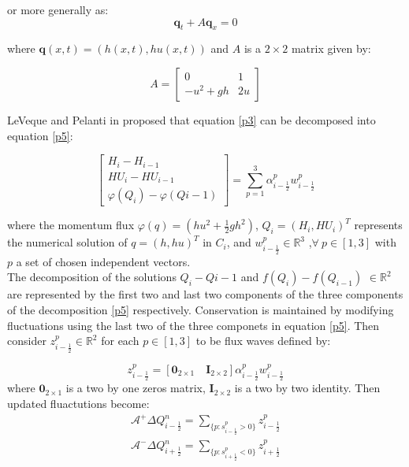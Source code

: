 \documentclass[12pt,a4paper]{article}
\begin{document}
	\noindent or more generally as:
	\begin{equation}
		\mathbf q_t + A \mathbf q_x = 0
	\end{equation}
	
	\noindent where $\mathbf q(x,t) = (h(x,t), hu(x,t))$ and $A$ is a $2 \times 2$ matrix given by:
	
	\begin{equation}
		A = \begin{bmatrix} 0 &  1 \\ -u^{2} + gh & 2u \end{bmatrix}
	\end{equation}
	
	\noindent LeVeque and Pelanti in \cite{leveque2001class} proposed that equation \eqref{p3} can be decomposed into equation \eqref{p5}:
	
	\begin{equation}
				\begin{bmatrix} 
					H_{i} - H_{i-1}\\ 	HU_{i} - HU_{i-1} \\  \varphi(Q_{i}) - \varphi(Q{i-1}) 
				\end{bmatrix} = \sum_{p=1}^{3} \alpha_{i-\frac{1}{2}}^{p} w_{i-\frac{1}{2}}^{p}
			\label{p5}
	\end{equation}

	\noindent where the momentum flux $\varphi(q) = (hu^{2} + \frac{1}{2} gh^{2})$, $Q_{i} = (H_{i},HU_{i})^{T}$ represents the numerical solution of $q = (h,hu)^{T}$ in $C_{i}$, and $w_{i-\frac{1}{2}}^{p} \in \mathbb{R}^{3}$ ,$\forall ~ p \in [1,3] $ with $p$ a set of chosen independent vectors. \\
	
	\noindent The decomposition of the solutions $Q_{i} - Q{i-1} $  and  $f(Q_{i}) - f(Q_{i-1})$ $ \in  \mathbb{R}^{2}$ are represented by the first two and last two components of the three components of the decomposition \eqref{p5} respectively.  Conservation is maintained by modifying fluctuations using the last two of the three componets  in equation \eqref{p5}. Then  consider $z_{i-\frac{1}{2}}^{p} \in \mathbb{R}^{2}$ for each $p \in [1,3]$ to be flux waves defined by:
	
	\begin{equation}
		z_{i-\frac{1}{2}}^{p} = [\mathbf{0}_{2\times1} \quad \mathbf{I}_{2\times2}] \alpha_{i-\frac{1}{2}}^{p} w_{i-\frac{1}{2}}^{p}
	\end{equation}
	where $\mathbf{0}_{2\times1}$ is a two by one zeros matrix, $\mathbf{I}_{2\times2}$ is a two by two identity. Then updated fluactutions become:
 	\begin{eqnarray}
		\mathcal{A^{+}}\Delta Q_{i-\frac{1}{2}}^{n} = \sum_{\{ p:s_{i-\frac{1}{2}}^{p}>0\}}  z_{i-\frac{1}{2}}^{p}
		\label{p7}\\
		\mathcal{A^{-}}\Delta Q_{i+\frac{1}{2}}^{n} = \sum_{\{ p:s_{i+\frac{1}{2}}^{p}<0\}} z_{i+\frac{1}{2}}^{p}
		\label{p8}
	\end{eqnarray}
\end{document}
